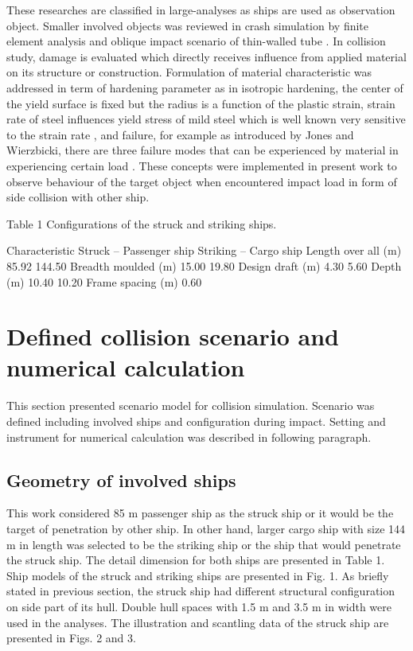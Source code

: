 \documentclass[10pt,journal]{IEEEtran}
\begin{document}
These researches are classified in large-analyses as ships are used as observation object. Smaller involved objects was reviewed in crash simulation by finite element analysis \cite{abdel2013frontal} 
and oblique impact scenario of thin-walled tube \cite{manikandaraja2016numerical}. 
In collision study, damage is evaluated which directly receives influence from applied material on its structure or construction. Formulation of material characteristic was addressed in term of hardening parameter \cite{krieg1976implementation}
as in isotropic hardening, the center of the yield surface is fixed but the radius is a function of the plastic strain, strain rate of steel influences yield stress of mild steel which is well known very sensitive to the strain rate 
\cite{jones1993criteria}, and failure, for example as introduced by Jones and Wierzbicki, there are three failure modes that can be experienced by material in experiencing certain load \cite{jones2011structural}. 
These concepts were implemented in present work to observe behaviour of the target object when encountered impact load in form of side collision with other ship. 


Table 1 
Configurations of the struck and striking ships. 

Characteristic Struck – Passenger ship  Striking – Cargo ship 
Length over all (m) 85.92 144.50 
Breadth moulded (m) 15.00 19.80 
Design draft (m) 4.30 5.60 
Depth (m) 10.40 10.20 
Frame spacing (m) 0.60 ­


\section{Defined collision scenario and numerical calculation}

This section presented scenario model for collision simulation. 
Scenario was defined including involved ships and configuration during impact. Setting and instrument for numerical calculation was described in following paragraph. 

\subsection{Geometry of involved ships}

This work considered 85 m passenger ship as the struck ship or it would be the target of penetration by other ship. 
In other hand, larger cargo ship with size 144 m in length was selected to be the striking ship or the ship that would penetrate the struck ship. 
The detail dimension for both ships are presented in Table 1. Ship models of the struck and striking ships are presented in Fig. 1. 
As briefly stated in previous section, the struck ship had different structural configuration on side part of its hull. Double hull spaces with 1.5 m and 3.5 m in width were used in the analyses. 
The illustration and scantling data of the struck ship are presented in Figs. 2 and 3. 
\end{document}
